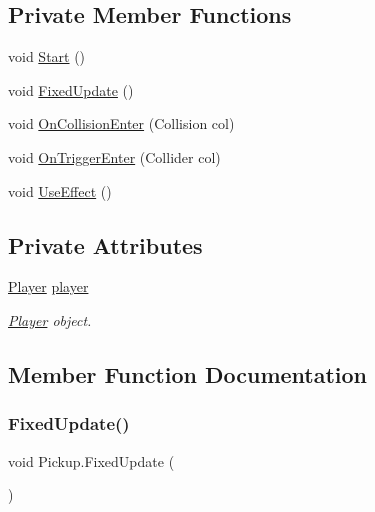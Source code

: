 \subsection*{Private Member Functions}
\begin{DoxyCompactItemize}
\item 
void \hyperlink{class_pickup_aa0f4313f4bb636d95ec9ba901f4dc932}{Start} ()
\item 
void \hyperlink{class_pickup_a86ae9269c20eca5a07f9e6ae24eaae7c}{Fixed\+Update} ()
\item 
void \hyperlink{class_pickup_af91a544b99c9d52864ec6a074df98d73}{On\+Collision\+Enter} (Collision col)
\item 
void \hyperlink{class_pickup_a5f190e230de9ed4839c26642785896be}{On\+Trigger\+Enter} (Collider col)
\item 
void \hyperlink{class_pickup_a0375f0d9e0a3021b0718e565978498b0}{Use\+Effect} ()
\end{DoxyCompactItemize}
\subsection*{Private Attributes}
\begin{DoxyCompactItemize}
\item 
\mbox{\label{class_pickup_a65bec7d3f99a526334f3d8e262b9f658}} 
\hyperlink{class_player}{Player} \hyperlink{class_pickup_a65bec7d3f99a526334f3d8e262b9f658}{player}
\begin{DoxyCompactList}\small\item\em \hyperlink{class_player}{Player} object. \end{DoxyCompactList}\end{DoxyCompactItemize}


\subsection{Member Function Documentation}
\mbox{\label{class_pickup_a86ae9269c20eca5a07f9e6ae24eaae7c}} 
\subsubsection{\texorpdfstring{Fixed\+Update()}{FixedUpdate()}}
{\footnotesize\ttfamily void Pickup.\+Fixed\+Update (\begin{DoxyParamCaption}{ }\end{DoxyParamCaption})\hspace{0.3cm}{\ttfamily [private]}}

